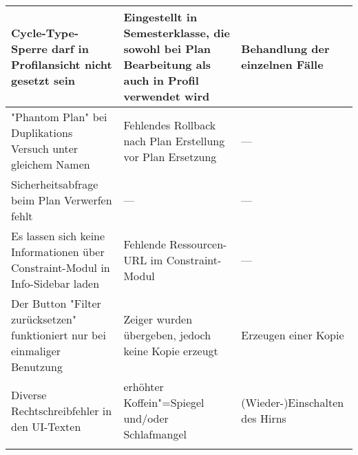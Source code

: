 \begin{longtable}{| >{\hspace{0pt}} p{} | >{\hspace{0pt}} p{} | >{\hspace{0pt}} p{} | }
	Cycle-Type-Sperre darf in Profilansicht nicht gesetzt sein & Eingestellt in Semesterklasse, die sowohl bei Plan Bearbeitung als auch in Profil verwendet wird & Behandlung der einzelnen Fälle \\
	\hline
	"Phantom Plan" bei Duplikations Versuch unter gleichem Namen & Fehlendes Rollback nach Plan Erstellung vor Plan Ersetzung & --- \\
	\hline
	Sicherheitsabfrage beim Plan Verwerfen fehlt & --- & --- \\
	\hline
	Es lassen sich keine Informationen über Constraint-Modul in Info-Sidebar laden & Fehlende Ressourcen-URL im Constraint-Modul & --- \\
	\hline
	Der Button "Filter zurücksetzen" funktioniert nur bei einmaliger Benutzung & Zeiger wurden übergeben, jedoch keine Kopie erzeugt & Erzeugen einer Kopie \\
	\hline
	Diverse Rechtschreibfehler in den UI-Texten & erhöhter Koffein"=Spiegel und/oder Schlafmangel & (Wieder-)Einschalten des Hirns \\
	\hhline{|=|=|=|}
\end{longtable}